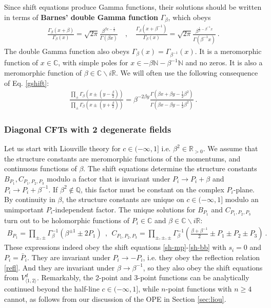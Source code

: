 \documentclass[12pt, a4paper]{article}
\theoremstyle{break}
\begin{document}
Since shift equations produce Gamma functions, their solutions should be written in terms of \textbf{Barnes' double Gamma function} $\Gamma_\beta$, which obeys
\begin{align}
\frac{\Gamma_\beta(x+\beta)}{\Gamma_\beta(x)} = \sqrt{2\pi}\frac{\beta^{\beta x-\frac12}}{\Gamma(\beta x)}
\quad , \quad 
\frac{\Gamma_\beta(x+\beta^{-1})}{\Gamma_\beta(x)} = \sqrt{2\pi}\frac{\beta^{\frac12-\beta^{-1}x}}{\Gamma(\beta^{-1}x)} \ .
\label{gshift}
\end{align}
The double Gamma function also obeys $\Gamma_\beta(x)= \Gamma_{\beta^{-1}}(x)$. It is a meromorphic function of $x\in\mathbb{C}$, with simple poles for $x\in -\beta\mathbb{N}-\beta^{-1}\mathbb{N}$ and no zeros. It is also a meromorphic function of $\beta\in \mathbb{C}\backslash i\mathbb{R}$. We will often use the following consequence of Eq. \eqref{gshift}:
\begin{align}
 \frac{\prod_\pm \Gamma_\beta\left(x \pm (y-\frac{\beta}{2})\right)}{\prod_\pm \Gamma_\beta\left(x \pm (y+\frac{\beta}{2})\right)} = \beta^{-2\beta y}\frac{\Gamma\left(\beta x+\beta y - \frac12 \beta^2\right)}{\Gamma\left(\beta x-\beta y -\frac12 \beta^2\right)}\ . 
\end{align}


\subsubsection{Diagonal CFTs with 2 degenerate fields}

Let us start with Liouville theory for $c\in (-\infty ,1]$ i.e. $\beta^2\in\mathbb{R}_{>0}$. 
We assume that the structure constants are meromorphic functions of the momentums, and continuous functions of $\beta$. 
The shift equations determine the structure constants $B_{P_1},C_{P_1,P_2,P_3}$ modulo a factor that is invariant under $P_i\to P_i+\beta$ and $P_i\to P_i+\beta^{-1}$. 
If $\beta^2\notin \mathbb{Q}$, this factor must be constant on the complex $P_i$-plane. By continuity in $\beta$, the structure constants are unique on $c\in (-\infty,1]$ modulo an unimportant $P_i$-independent factor. The unique solutions for $B_{P_1}$ and $C_{P_1,P_2,P_3}$ turn out to be holomorphic functions of $P_i\in\mathbb{C}$ and $\beta\in \mathbb{C}\backslash i\mathbb{R}$:
\begin{align}
 \boxed{B_{P_1} = \prod_{\pm,\pm}\Gamma_\beta^{-1}\left(\beta^{\pm 1}\pm 2P_1\right)} \ \  , \ \ \boxed{C_{P_1,P_2,P_3} =\prod_{\pm,\pm,\pm} \Gamma_\beta^{-1}\left(\tfrac{\beta+\beta^{-1}}{2} \pm P_1\pm P_2\pm P_3\right)}\ . 
 \label{bc}
\end{align}
These expressions indeed obey the shift equations \eqref{sh-mp}-\eqref{sh-bb} with $s_i=0$ and $P_i=\bar P_i$.
They are invariant under $P_i\to -P_i$, i.e. they obey the reflection relation \eqref{refl}.
And they are invariant under $\beta \to \beta^{-1}$, so they also obey the shift equations from $V^d_{\langle 1,2\rangle}$. 
Remarkably, the 2-point and 3-point functions can be analytically continued beyond the half-line $c\in (-\infty ,1]$, while $n$-point functions with $n\geq 4$ cannot, as follows from our discussion of the OPE in Section \ref{sec:liou}. 
\end{document}

